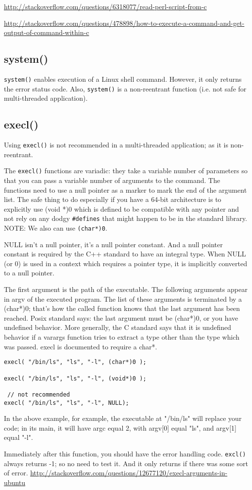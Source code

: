 \url{http://stackoverflow.com/questions/6318077/read-perl-script-from-c}

\url{http://stackoverflow.com/questions/478898/how-to-execute-a-command-and-get-output-of-command-within-c}

\subsection{system()}
\label{sec:system()}

\verb!system()! enables execution of a Linux shell command. However, it only
returns the error status code.
Also, \verb!system()! is a non-reentrant function (i.e. not safe for
multi-threaded application).


\subsection{execl()}
\label{sec:execl()}

Using \verb!execl()! is not recommended in a multi-threaded application; as it
is non-reentrant.

The \verb!execl()! functions are variadic: they take a variable number of
parameters so that you can pass a variable number of arguments to the command.
The functions need to use a null pointer as a marker to mark the end of the
argument list. 
The safe thing to do especially if you have a 64-bit architecture is to
explicitly use (void *)0 which is defined to be compatible with any pointer and
not rely on any dodgy \verb!#defines! that might happen to be in the standard
library. NOTE: We also can use \verb!(char*)0!.

NULL isn't a null pointer, it's a null pointer constant. And a null pointer
constant is required by the C++ standard to have an integral type.
When NULL (or 0) is used in a context which requires a pointer type, it is
implicitly converted to a null pointer.

The first argument is the path of the executable. The following arguments appear
in argv of the executed program. The list of these arguments is terminated by a
(char*)0; that's how the called function knows that the last argument has been
reached. Posix standard says: the last argument must be (char*)0, or you have
undefined behavior.
More generally, the C standard says that it is undefined behavior if a varargs
function tries to extract a type other than the type which was passed. execl is
documented to require a char*.


\begin{verbatim}
execl( "/bin/ls", "ls", "-l", (char*)0 );

execl( "/bin/ls", "ls", "-l", (void*)0 );

 // not recommended
execl( "/bin/ls", "ls", "-l", NULL);

\end{verbatim}
In the above example, for example, the executable at "/bin/ls" will
replace your code; in its main, it will have argc equal 2, with argv[0] equal
"ls", and argv[1] equal "-l".



Immediately after this function, you should have the error handling code.
\verb!excl()! always returns -1; so no need to test it.  And it only returns if
there was some sort of error.
\url{http://stackoverflow.com/questions/12677120/execl-arguments-in-ubuntu}